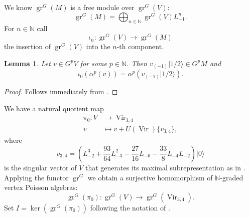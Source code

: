 \documentclass[12pt, a4paper]{article}
\newtheorem{lemma}{Lemma}
\DeclareMathOperator{\Vir}{Vir}
\DeclareMathOperator{\gr}{gr}
\newcommand{\vac}{|0\rangle}
\newcommand{\vachalf}{|1/2\rangle}
\begin{document}
We know $\gr^G(M)$ is a free module over $\gr^G(V)$:
\begin{equation*}
  \gr^G(M)=\bigoplus_{n\in \mathbb{N}}\gr^G(V)L_{-1}^n.
\end{equation*}
For $n\in \mathbb{N}$ call
\begin{equation*}
  \iota_n:\gr^G(V)\to\gr^G(M)
\end{equation*}
the insertion of $\gr^G(V)$ into the $n$-th component.

\begin{lemma}
  \label{lmm:9}
  Let $v \in G^pV$ for some $p \in \mathbb{N}$.
  Then $v_{(-1)}\vachalf \in G^pM$ and
  \begin{equation*}
    \iota_0(\alpha^p(v)) = \alpha^p(v_{(-1)}\vachalf).
  \end{equation*}
\end{lemma}

\begin{proof}
  Follows immediately from .
\end{proof}

We have a natural quotient map
\begin{align*}
  \pi_0: V &\to \Vir_{3, 4} \\
 v &\mapsto v + U(\Vir)\{v_{3, 4}\},
\end{align*}
where
\begin{equation*}
  v_{3, 4} = (L_{-2}^3 + \frac{93}{64}L_{-3}^2 - \frac{27}{16}L_{-6} - \frac{33}{8}L_{-4}L_{-2})\vac
\end{equation*}
is the singular vector of $V$ that generates its maximal subrepresentation as in \cite{andrews_singular_2022}.
Applying the functor $\gr^G$ we obtain a surjective homomorphism of $\mathbb{N}$-graded vertex Poisson algebras:
\begin{equation*}
  \gr^G(\pi_0): \gr^G(V) \to \gr^G(\Vir_{3, 4}).
\end{equation*}
Set $I = \ker(\gr^G(\pi_0))$ following the notation of \cite{andrews_singular_2022}.
\end{document}
